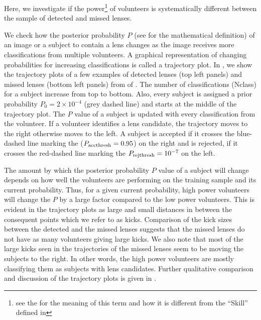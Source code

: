 \documentclass[useAMS,usenatbib,a4paper]{mn2e}
\begin{document}
Here, we investigate if the power\footnote{see the
 for the meaning of this term and how it is
different from the ``Skill'' defined in \PaperOne} of volunteers is systematically
different between the sample of detected and missed lenses.

We check how the posterior probability $P$ (see \PaperOne for the
mathematical definition) of an image or a subject to contain a lens
changes as the image receives more classifications from multiple
volunteers. A graphical representation of changing probabilities for
increasing classifications is called a trajectory plot. In
, we show the trajectory plots of a few examples of
detected lenses (top left panels) and missed lenses (bottom left panels)
from \StageOne of \sw. The number of classifications (Nclass) for a
subject increase from top to bottom.  Also, every subject is assigned a
prior probability $P_0=2\times10^{-4}$ (grey dashed line) and starts at
the middle of the trajectory plot. The $P$ value of a subject is updated
with every classification from the volunteer.  If a volunteer identifies
a lens candidate, the trajectory moves to the right otherwise moves to
the left. A subject is accepted if it crosses the blue-dashed line
marking the ($P_{\rm acc thresh}=0.95$) on the right and is rejected, if
it crosses the red-dashed line marking the $P_{\rm rej thresh}=10^{-7}$
on the left.

The amount by which the posterior probability $P$ value of a subject will
change depends on how well the volunteers are performing on the training
sample and its current probability. Thus, for a given current
probability, high power volunteers will change the $P$ by a large factor
compared to the low power volunteers. This is evident in the trajectory
plots as large and small distances in between the consequent points
which we refer to as kicks. Comparison of the kick sizes between the
detected and the missed lenses suggests that the missed lenses do not
have as many volunteers giving large kicks. We also note that most of
the large kicks seen in the trajectories of the missed lenses seem to be
moving the subjects to the right. In other words, the high power
volunteers are mostly classifying them as subjects with lens candidates.
Further qualitative comparison and discussion of the trajectory plots is
given in .
\end{document}
